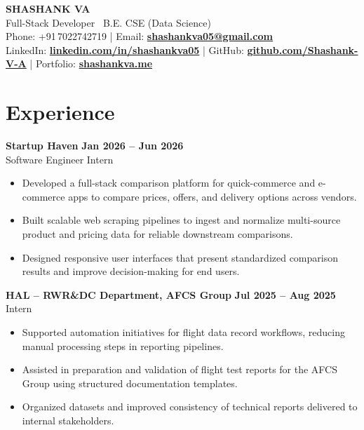 \documentclass[9pt,letterpaper]{article}
\newcommand{\resumeSubheading}[4]{%
  \vspace{1pt}%
  \textbf{#1} \hfill {\bfseries #2}\\[2pt]
  {#3} \hfill {\color{muted}\small #4}\par\vspace{1pt}%
}
\newcommand{\resumeItem}{\item}
\newcommand{\resumelink}[2]{\href{#1}{\textbf{#2}}}
\begin{document}
\begin{center}
  {\fontsize{24}{28}\selectfont\bfseries\color{accent} SHASHANK VA}\\[2pt]
  {Full-Stack Developer \textbar\ B.E. CSE (Data Science)}\\[4pt]
  \small
  Phone: +91\,7022742719 \quad | \quad
  Email: \resumelink{mailto:shashankva05@gmail.com}{shashankva05@gmail.com}\\[2pt]
  LinkedIn: \resumelink{https://linkedin.com/in/shashankva05}{linkedin.com/in/shashankva05} \quad | \quad
  GitHub: \resumelink{https://github.com/Shashank-V-A}{github.com/Shashank-V-A} \quad | \quad
  Portfolio: \resumelink{http://shashankva.me/}{shashankva.me}
\end{center}
\vspace{1pt}

\section{Experience}

\resumeSubheading
  {Startup Haven}{Jan 2026 -- Jun 2026}
  {Software Engineer Intern}{}
\begin{itemize}[leftmargin=*, nosep, topsep=1pt, itemsep=0pt]
  \resumeItem{Developed a full-stack comparison platform for quick-commerce and e-commerce apps to compare prices, offers, and delivery options across vendors.}
  \resumeItem{Built scalable web scraping pipelines to ingest and normalize multi-source product and pricing data for reliable downstream comparisons.}
  \resumeItem{Designed responsive user interfaces that present standardized comparison results and improve decision-making for end users.}
\end{itemize}

\resumeSubheading
  {HAL -- RWR\&DC Department, AFCS Group}{Jul 2025 -- Aug 2025}
  {Intern}{}
\begin{itemize}[leftmargin=*, nosep, topsep=1pt, itemsep=0pt]
  \resumeItem{Supported automation initiatives for flight data record workflows, reducing manual processing steps in reporting pipelines.}
  \resumeItem{Assisted in preparation and validation of flight test reports for the AFCS Group using structured documentation templates.}
  \resumeItem{Organized datasets and improved consistency of technical reports delivered to internal stakeholders.}
\end{itemize}

\end{document}

